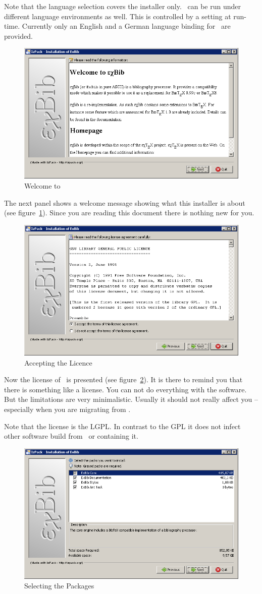 Note that the language selection covers the installer only. \ExBib\ 
can be run under different language environments as well. This is
controlled by a setting at run-time. Currently only an English and
a German language binding for \ExBib\ are provided.\index{language}

\begin{figure}[!ht]
  \centering
  \includegraphics[width=.45\textwidth]{img/inst3}
  \caption{Welcome to \ExBib}
  \label{fig:inst2}
\end{figure}

The next panel shows a welcome message showing what this installer is
about (see figure~\ref{fig:inst2}). Since you are reading this
document there is nothing new for you.

\begin{figure}[!ht]
  \centering
  \includegraphics[width=.45\textwidth]{img/inst4}
  \caption{Accepting the Licence}
  \label{fig:inst3}
\end{figure}

Now the license of \ExBib\ is presented (see
figure~\ref{fig:inst3}). It is there to remind you that there is
something like a license. You can not do everything with the software.
But the limitations are very minimalistic. Usually it should not
really affect you -- especially when you are migrating from \BibTeX.

Note that the license is the LGPL. In
contrast to the GPL\index{GPL}\index{license!GPL} it does not infect
other software build from \ExBib\ or containing it.

\begin{figure}[!ht]
  \centering
  \includegraphics[width=.45\textwidth]{img/inst5}
  \caption{Selecting the Packages}
  \label{fig:inst4}
\end{figure}

